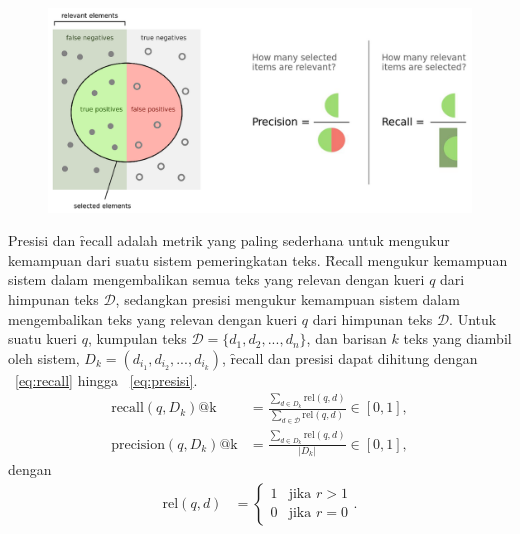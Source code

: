         \begin{figure}[!ht]
            \centering
            \includegraphics[width=.9\textwidth]{assets/pics/recall-presisi.png}
            \label{fig:recall-precision}
        \end{figure}
        Presisi dan \f{recall} adalah metrik yang paling sederhana untuk mengukur kemampuan dari suatu sistem pemeringkatan teks. \f{Recall} mengukur kemampuan sistem dalam mengembalikan semua teks yang relevan dengan kueri $q$ dari himpunan teks $\mathcal{D}$, sedangkan presisi mengukur kemampuan sistem dalam mengembalikan teks yang relevan dengan kueri $q$ dari himpunan teks $\mathcal{D}$. Untuk suatu kueri $q$, kumpulan teks $\mathcal{D} = \{d_1, d_2, ..., d_n\}$, dan barisan $k$ teks yang diambil oleh sistem, $D_k = (d_{i_1}, d_{i_2}, ..., d_{i_k})$, \f{recall} dan presisi dapat dihitung dengan \equ~\ref{eq:recall} hingga \equ~\ref{eq:presisi}.
        \begin{align}
            \label{eq:recall}
            \text{recall}(q, D_k)\text{@k} &= \frac{\sum_{d \in D_k} \text{rel}(q, d)}{\sum_{d \in \mathcal{D}} \text{rel}(q, d)} \in [0, 1], \\
            \label{eq:presisi}
            \text{precision}(q, D_k)\text{@k} &= \frac{\sum_{d \in D_k} \text{rel}(q, d)}{|D_k|} \in [0, 1], %
        \end{align}
dengan
        \begin{align}
            \label{eq:rel}
            \text{rel}(q, d) &= \begin{cases} 
            1 & \text{jika } r > 1 \\
            0 & \text{jika } r = 0
            \end{cases}.
        \end{align}

